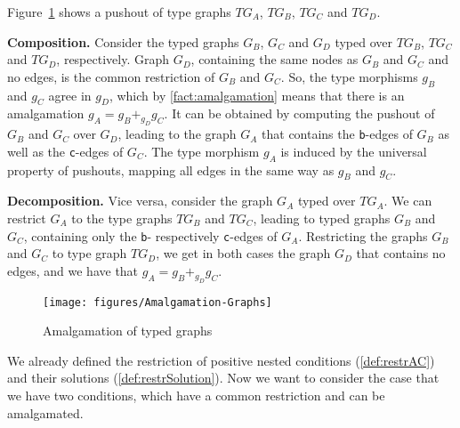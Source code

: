 \begin{example}\label{ex:amalgamation-objects}
	Figure~\ref{fig:amalgamation-objects} shows a pushout of type graphs $TG_A$, $TG_B$, $TG_C$ and $TG_D$. 
	\begin{description}
		\item \textbf{Composition.}
			Consider the typed graphs $G_B$, $G_C$ and $G_D$ typed over $TG_B$, $TG_C$ and $TG_D$, respectively. Graph $G_D$, containing 
			the same nodes as $G_B$ and $G_C$ and no edges, is the common restriction of $G_B$ and $G_C$. So, the type morphisms $g_B$ and $g_C$
			agree in $g_D$, which by \autoref{fact:amalgamation} means that there is an amalgamation $g_A = g_B +_{g_D} g_C$. It can be obtained
			by computing the pushout of $G_B$ and $G_C$ over $G_D$, leading to the graph $G_A$ that contains the \texttt{b}-edges of $G_B$ as well
			as the \texttt{c}-edges of $G_C$. The type morphism $g_A$ is induced by the universal property of pushouts, mapping all edges
			in the same way as $g_B$ and $g_C$.
		\item \textbf{Decomposition.}
			Vice versa, consider the graph $G_A$ typed over $TG_A$. We can restrict $G_A$ to the type graphs $TG_B$ and $TG_C$, leading
			to typed graphs $G_B$ and $G_C$, containing only the \texttt{b}- respectively \texttt{c}-edges of $G_A$. Restricting the graphs
			$G_B$ and $G_C$ to type graph $TG_D$, we get in both cases the graph $G_D$ that contains no edges, and we have that $g_A = g_B +_{g_D} g_C$.
	\end{description}
	
	\begin{figure}[htb]\centering
	\texttt{[image: figures/Amalgamation-Graphs]}
	\caption{Amalgamation of typed graphs}\label{fig:amalgamation-objects}
	\end{figure}
\end{example}

We already defined the restriction of positive nested conditions (\autoref{def:restrAC}) and their solutions \linebreak (\autoref{def:restrSolution}). Now we want to consider the case that we have two conditions, which have a common restriction and can be amalgamated.


